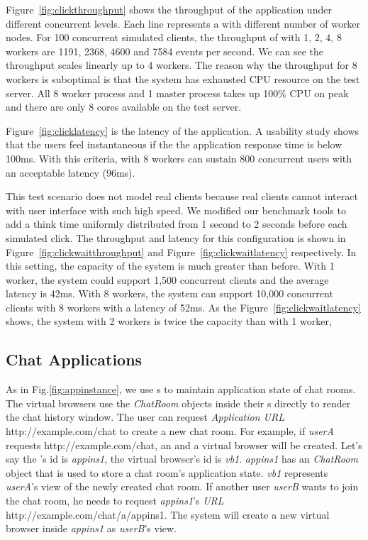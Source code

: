 \clickthroughput{}

Figure~\ref{fig:clickthroughput} shows the throughput of the application 
under different concurrent levels.
Each line represents a \cb{} with different number of worker nodes.
For 100 concurrent simulated clients, 
the throughput of \cb{} with 1, 2, 4, 8 workers are 1191, 2368, 4600 and 7584 events
per second.
We can see the throughput scales linearly up to 4 workers.
The reason why the throughput for 8 workers is suboptimal is that the
system has exhausted CPU resource on the test server.
All 8 worker process and 1 master process takes up 100\% CPU on peak and there are
only 8 cores available on the test server.

\clicklatency{}

Figure~\ref{fig:clicklatency} is the latency of the application.
A usability study shows that the users feel instantaneous if the 
the application response time is below 100ms.
With this criteria,
\cb{} with 8 workers can sustain 800 concurrent users with an acceptable latency (96ms).

This test scenario does not model real clients because real clients cannot 
interact with user interface with such high speed.
We modified our benchmark tools to add a think time 
uniformly distributed from 1 second to 2 seconds before each simulated click.
The throughput and latency for this configuration is shown 
in Figure~\ref{fig:clickwaitthroughput} and Figure~\ref{fig:clickwaitlatency} respectively.
In this setting, the capacity of the system is much greater than before.
With 1 worker, the system could support 1,500 concurrent clients and the average latency is 42ms.
With 8 workers, 
the system can support 10,000 concurrent clients with 8 workers with a latency of 52ms.
As the Figure~\ref{fig:clickwaitlatency} shows, 
the system with 2 workers is twice the capacity than with 1 worker,



\clickwaitthroughput{}
\clickwaitlatency{}

\subsection{Chat Applications}
As in Fig.\ref{fig:appinstance},
we use \appins{}s to maintain application state of chat rooms.
The virtual browsers use the \emph{ChatRoom} objects inside their \appins{}s 
directly to render the chat history window.
The user can request \emph{Application URL} http://example.com/chat
to create a new chat room.
For example, if 
\emph{userA} requests http://example.com/chat,
an \appins{} and a virtual browser will be created.
Let's say the \appins{}'s id is \emph{appins1},
the virtual browser's id is \emph{vb1}.
\emph{appins1} has an \emph{ChatRoom} object that is used to store 
a chat room's application state.
\emph{vb1} represents \emph{userA}'s view of the newly created
chat room.
If another user \emph{userB} wants to join the chat room, 
he needs to request \emph{appins1}'s \emph{\appins{} URL} 
http://example.com/chat/a/appins1.
The system will create a new virtual browser inside \emph{appins1}
as \emph{userB}'s view.


